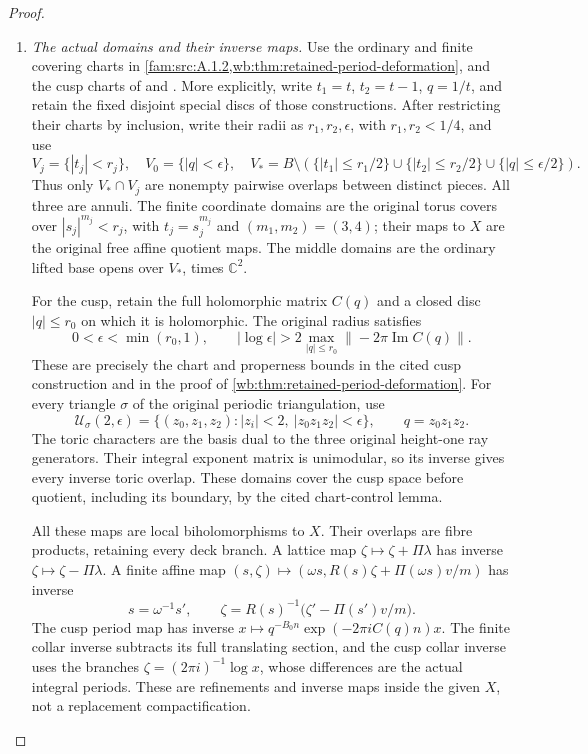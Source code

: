 \begin{proof}
\begin{enumerate}[label=\arabic*.,leftmargin=*]
\item \emph{The actual domains and their inverse maps.}
Use the ordinary and finite covering charts in
\cref{fam:src:A.1.2,wb:thm:retained-period-deformation}, and the cusp
charts of  and
.
More explicitly, write $t_1=t$, $t_2=t-1$, $q=1/t$, and retain
the fixed disjoint special discs of those constructions.  After
restricting their charts by inclusion, write their radii as
$r_1,r_2,\epsilon$, with $r_1,r_2<1/4$, and use
\[
 V_j=\{|t_j|<r_j\},\quad
 V_0=\{|q|<\epsilon\},\quad
 V_*=B\setminus\left(
 \{|t_1|\le r_1/2\}\cup\{|t_2|\le r_2/2\}
 \cup\{|q|\le\epsilon/2\}\right).
\]
Thus only $V_*\cap V_j$ are nonempty pairwise overlaps between
distinct pieces.  All three are annuli.  The finite coordinate domains
are the original torus covers over $|s_j|^{m_j}<r_j$, with
$t_j=s_j^{m_j}$ and $(m_1,m_2)=(3,4)$; their maps to $X$ are the
original free affine quotient maps.  The middle domains are the
ordinary lifted base opens over $V_*$, times $\mathbb C^2$.

For the cusp, retain the full holomorphic matrix $C(q)$ and a closed
disc $|q|\le r_0$ on which it is holomorphic.  The original radius
satisfies
\[
 0<\epsilon<\min(r_0,1),\qquad
 |\log\epsilon|>
 2\max_{|q|\le r_0}\|-2\pi\operatorname{Im}C(q)\|.
\]
These are precisely the chart and properness bounds in the cited cusp
construction and in the proof of
\cref{wb:thm:retained-period-deformation}.  For every triangle
$\sigma$ of the original periodic triangulation, use
\[
 \mathcal U_\sigma(2,\epsilon)=
 \{(z_0,z_1,z_2): |z_i|<2,\ |z_0z_1z_2|<\epsilon\},
 \qquad q=z_0z_1z_2.
 \]
The toric characters are the basis dual to the three original
height-one ray generators.  Their integral exponent matrix is
unimodular, so its inverse gives every inverse toric overlap.
These domains cover the cusp space before quotient, including its
boundary, by the cited chart-control lemma.

All these maps are local biholomorphisms to $X$.  Their overlaps are
fibre products, retaining every deck branch.  A lattice map
$\zeta\mapsto\zeta+\Pi\lambda$ has inverse
$\zeta\mapsto\zeta-\Pi\lambda$.  A finite affine map
$(s,\zeta)\mapsto(\omega s,R(s)\zeta+\Pi(\omega s)v/m)$
has inverse
\[
 s=\omega^{-1}s',\qquad
 \zeta=R(s)^{-1}\bigl(\zeta'-\Pi(s')v/m\bigr).
\]
The cusp period map has inverse
$x\mapsto q^{-B_0n}\exp(-2\pi iC(q)n)x$.
The finite collar inverse subtracts its full translating section,
and the cusp collar inverse uses the branches
$\zeta=(2\pi i)^{-1}\log x$, whose differences are the actual
integral periods.  These are refinements and inverse maps inside the
given $X$, not a replacement compactification.


\end{enumerate}
\end{proof}
